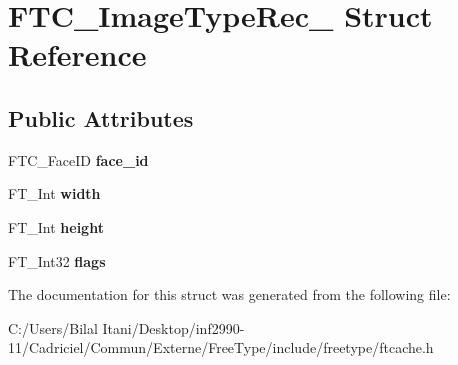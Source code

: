 \hypertarget{struct_f_t_c___image_type_rec__}{}\section{F\+T\+C\+\_\+\+Image\+Type\+Rec\+\_\+ Struct Reference}
\label{struct_f_t_c___image_type_rec__}
\subsection*{Public Attributes}
\begin{DoxyCompactItemize}
\item 
F\+T\+C\+\_\+\+Face\+ID {\bfseries face\+\_\+id}\hypertarget{struct_f_t_c___image_type_rec___a9851b8d4a06baacd18d5b9856fd85abd}{}\label{struct_f_t_c___image_type_rec___a9851b8d4a06baacd18d5b9856fd85abd}

\item 
F\+T\+\_\+\+Int {\bfseries width}\hypertarget{struct_f_t_c___image_type_rec___af1a4cccbabb0f5852ed755a12ed08dd8}{}\label{struct_f_t_c___image_type_rec___af1a4cccbabb0f5852ed755a12ed08dd8}

\item 
F\+T\+\_\+\+Int {\bfseries height}\hypertarget{struct_f_t_c___image_type_rec___adb56a9d18a3f522d713d0ba01c1a8778}{}\label{struct_f_t_c___image_type_rec___adb56a9d18a3f522d713d0ba01c1a8778}

\item 
F\+T\+\_\+\+Int32 {\bfseries flags}\hypertarget{struct_f_t_c___image_type_rec___a391782ed8c67de86591c71f276ea6454}{}\label{struct_f_t_c___image_type_rec___a391782ed8c67de86591c71f276ea6454}

\end{DoxyCompactItemize}


The documentation for this struct was generated from the following file\+:\begin{DoxyCompactItemize}
\item 
C\+:/\+Users/\+Bilal Itani/\+Desktop/inf2990-\/11/\+Cadriciel/\+Commun/\+Externe/\+Free\+Type/include/freetype/ftcache.\+h\end{DoxyCompactItemize}
